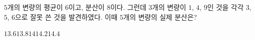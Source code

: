 $5$개의 변량의 평균이 $6$이고, 분산이 $8$이다. 그런데 $3$개의 변량이 $1$, $4$, $9$인 것을 각각 $3$, $5$, $6$으로 잘못 쓴 것을 발견하였다. 이때 $5$개의 변량의 실제 분산은?
\begin{choices32}{$13.6$}{$13.8$}{$14$}{$14.2$}{$14.4$}\end{choices32}
